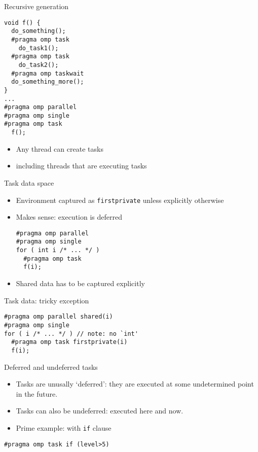 \begin{numberedframe}{Recursive generation}
\begin{lstlisting}
void f() {
  do_something();
  #pragma omp task
    do_task1();
  #pragma omp task
    do_task2();
  #pragma omp taskwait
  do_something_more();
}
...
#pragma omp parallel
#pragma omp single
#pragma omp task
  f();
\end{lstlisting}
  \begin{itemize}
  \item Any thread can create tasks
  \item including threads that are executing tasks
  \end{itemize}
\end{numberedframe}

\begin{exerciseframe}[taskfactor]
  
\end{exerciseframe}

\begin{numberedframe}{Task data space}
  \begin{itemize}
  \item Environment captured as \lstinline{firstprivate}
    unless explicitly otherwise
  \item Makes sense: execution is deferred
\begin{lstlisting}
#pragma omp parallel
#pragma omp single
for ( int i /* ... */ )
  #pragma omp task
  f(i);
\end{lstlisting}
  \item Shared data has to be captured explicitly
  \end{itemize}
\end{numberedframe}

\begin{numberedframe}{Task data: tricky exception}
\begin{lstlisting}
#pragma omp parallel shared(i)
#pragma omp single
for ( i /* ... */ ) // note: no `int'
  #pragma omp task firstprivate(i)
  f(i);
\end{lstlisting}
\end{numberedframe}

\begin{numberedframe}{Deferred and undeferred tasks}
  \begin{itemize}
  \item Tasks are unusally `deferred': they are executed
    at some undetermined point in the future.
  \item Tasks can also be undeferred: executed here and now.
  \item Prime example: with \lstinline{if} clause
  \end{itemize}
\begin{lstlisting}
#pragma omp task if (level>5)
\end{lstlisting}
\end{numberedframe}

